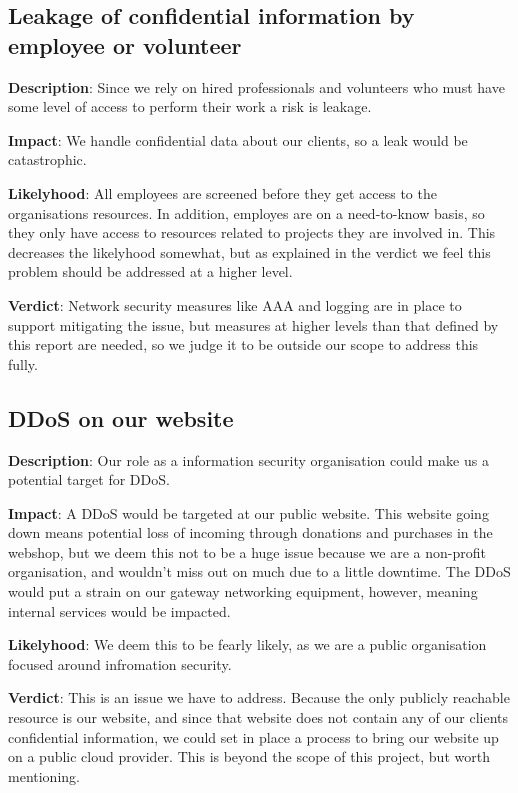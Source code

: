 \subsection{Leakage of confidential information by employee or volunteer}

\textbf{Description}: Since we rely on hired professionals and volunteers who must have some level of access to perform their work a risk is leakage.

\textbf{Impact}: We handle confidential data about our clients, so a leak would be catastrophic.

\textbf{Likelyhood}: All employees are screened before they get access to the organisations resources. In addition, employes are on a need-to-know basis, so they only have access to resources related to projects they are involved in. This decreases the likelyhood somewhat, but as explained in the verdict we feel this problem should be addressed at a higher level.

\textbf{Verdict}: Network security measures like AAA and logging are in place to support mitigating the issue, but measures at higher levels than that defined by this report are needed, so we judge it to be outside our scope to address this fully.

\subsection{DDoS on our website}

\textbf{Description}: Our role as a information security organisation could make us a potential target for DDoS.

\textbf{Impact}: A DDoS would be targeted at our public website. This website going down means potential loss of incoming through donations and purchases in the webshop, but we deem this not to be a huge issue because we are a non-profit organisation, and wouldn't miss out on much due to a little downtime. The DDoS would put a strain on our gateway networking equipment, however, meaning internal services would be impacted.

\textbf{Likelyhood}: We deem this to be fearly likely, as we are a public organisation focused around infromation security.

\textbf{Verdict}: This is an issue we have to address. Because the only publicly reachable resource is our website, and since that website does not contain any of our clients confidential information, we could set in place a process to bring our website up on a public cloud provider. This is beyond the scope of this project, but worth mentioning. 


